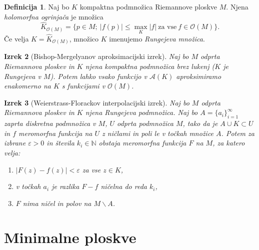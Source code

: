 \documentclass[12pt,a4paper,twoside]{article}
\theoremstyle{definition} %
\newtheorem{definicija}{Definicija}[section]
\theoremstyle{plain} %
\newtheorem{izrek}[definicija]{Izrek}
\numberwithin{equation}{section}  %
\newcommand{\N}{\mathbb N}
\begin{document}
\begin{definicija}
Naj bo $K$ kompaktna podmnožica Riemannove ploskve $M$. Njena \emph{holomorfna ogrinjača} je množica 
\begin{equation}
\widehat{K}_{\mathcal{O}(M)} = \{p \in M ; \ |f(p)| \leq \max_{K} |f| \ \text{za vse} \ f \in \mathcal{O}(M) \}.
\end{equation}
Če velja $K = \widehat{K}_{\mathcal{O}(M)}$, množico $K$ imenujemo \emph{Rungejeva množica}.
\end{definicija}

\begin{izrek} [Bishop-Mergelyanov aproksimacijski izrek] \label{izr:Bishop-Mergelyan}
Naj bo $M$ odprta Riemannova ploskev in $K$ njena kompaktna podmnožica brez lukenj ($K$ je Rungejeva v $M$). Potem lahko vsako funkcijo v $\mathcal{A}(K)$ aproksimiramo enakomerno na $K$ s funkcijami v $\mathcal{O}(M)$.
\end{izrek}

\begin{izrek} [Weierstrass-Florackov interpolacijski izrek] \label{izr:Weierstrass-Florack}
Naj bo $M$ odprta Riemannova ploskev in $K$ njena Rungejeva podmnožica. Naj bo $A = \{ a_i \}_{i=1}^{\infty}$ zaprta diskretna podmnožica v $M$, $U$ odprta podmnožica $M$, tako da je $A \cup K \subset U$ in $f$ meromorfna funkcija na $U$ z ničlami in poli le v točkah množice $A$.
Potem za izbrane $\varepsilon > 0$ in števila $k_{i} \in \N$ obstaja meromorfna funkcija $F$ na $M$, za katero velja:
\begin{enumerate}
\item $|F(z) - f(z)| < \varepsilon$ za vse $z \in K$,
\item v točkah $a_i$ je razlika $F-f$ ničelna do reda $k_i$,
\item $F$ nima ničel in polov na $M \backslash A$.
\end{enumerate} 
\end{izrek}

\section{Minimalne ploskve}

\end{document}
